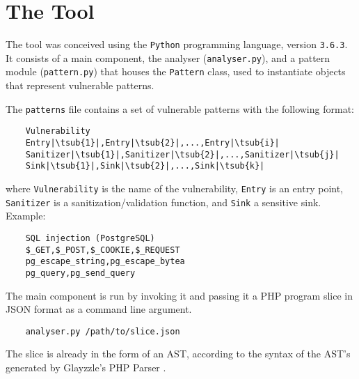 \section{The Tool}
\label{sec:tool}

The tool was conceived using the \verb|Python| programming language, version
\verb|3.6.3|. It consists of a main component, the analyser
(\verb|analyser.py|), and a pattern module (\verb|pattern.py|) that houses the
\verb|Pattern| class, used to instantiate objects that represent vulnerable
patterns.

The \verb|patterns| file contains a set of vulnerable patterns with the
following format:

\begin{lstlisting}
    Vulnerability
    Entry|\tsub{1}|,Entry|\tsub{2}|,...,Entry|\tsub{i}|
    Sanitizer|\tsub{1}|,Sanitizer|\tsub{2}|,...,Sanitizer|\tsub{j}|
    Sink|\tsub{1}|,Sink|\tsub{2}|,...,Sink|\tsub{k}|
\end{lstlisting}

where \verb|Vulnerability| is the name of the vulnerability, \verb|Entry| is an
entry point, \verb|Sanitizer| is a sanitization/validation function, and
\verb|Sink| a sensitive sink. Example:

\begin{lstlisting}
    SQL injection (PostgreSQL)
    $_GET,$_POST,$_COOKIE,$_REQUEST
    pg_escape_string,pg_escape_bytea
    pg_query,pg_send_query
\end{lstlisting}

The main component is run by invoking it and passing it a PHP program slice in
JSON format as a command line argument.

\begin{verbatim}
    analyser.py /path/to/slice.json
\end{verbatim}

The slice is already in the form of an AST, according to the syntax of the AST's
generated by Glayzzle's PHP Parser \cite{glayzzle-php}.
